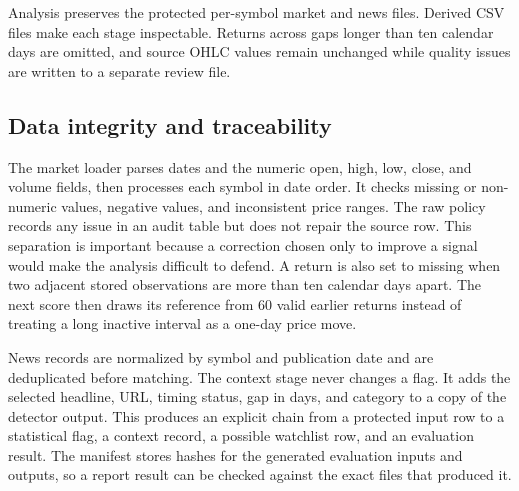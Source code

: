 {Analysis preserves the protected per-symbol market and news files. Derived CSV
files make each stage inspectable. Returns across gaps longer than ten calendar
days are omitted, and source OHLC values remain unchanged while quality issues
are written to a separate review file.

\subsection*{Data integrity and traceability}

The market loader parses dates and the numeric open, high, low, close, and
volume fields, then processes each symbol in date order. It checks missing or
non-numeric values, negative values, and inconsistent price ranges. The raw
policy records any issue in an audit table but does not repair the source row.
This separation is important because a correction chosen only to improve a
signal would make the analysis difficult to defend. A return is also set to
missing when two adjacent stored observations are more than ten calendar days
apart. The next score then draws its reference from 60 valid earlier returns
instead of treating a long inactive interval as a one-day price move.

News records are normalized by symbol and publication date and are
deduplicated before matching. The context stage never changes a flag. It adds
the selected headline, URL, timing status, gap in days, and category to a copy
of the detector output. This produces an explicit chain from a protected input
row to a statistical flag, a context record, a possible watchlist row, and an
evaluation result. The manifest stores hashes for the generated evaluation
inputs and outputs, so a report result can be checked against the exact files
that produced it.
}

